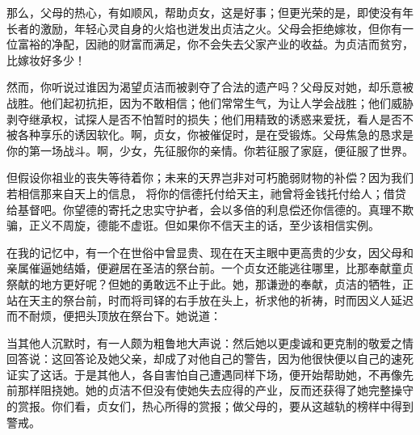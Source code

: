 那么，父母的热心，有如顺风，帮助贞女，这是好事；但更光荣的是，即使没有年长者的激励，年轻心灵自身的火焰也迸发出贞洁之火。父母会拒绝嫁妆，但你有一位富裕的净配，因祂的财富而满足，你不会失去父家产业的收益。为贞洁而贫穷，比嫁妆好多少！\par

然而，你听说过谁因为渴望贞洁而被剥夺了合法的遗产吗？父母反对她，却乐意被战胜。他们起初抗拒，因为不敢相信；他们常常生气，为让人学会战胜；他们威胁剥夺继承权，试探人是否不怕暂时的损失；他们用精致的诱惑来爱抚，看人是否不被各种享乐的诱因软化。啊，贞女，你被催促时，是在受锻炼。父母焦急的恳求是你的第一场战斗。啊，少女，先征服你的亲情。你若征服了家庭，便征服了世界。\par

但假设你祖业的丧失等待着你；未来的天界岂非对可朽脆弱财物的补偿？因为我们若相信那来自天上的信息， 将你的信德托付给天主，祂曾将金钱托付给人；借贷给基督吧。你望德的寄托之忠实守护者，会以多倍的利息偿还你信德的。真理不欺骗，正义不周旋，德能不虚诳。但如果你不信天主的话，至少该相信实例。\par

在我的记忆中，有一个在世俗中曾显贵、现在在天主眼中更高贵的少女，因父母和亲属催逼她结婚，便避居在圣洁的祭台前。一个贞女还能逃往哪里，比那奉献童贞祭献的地方更好呢？但她的勇敢远不止于此。她，那谦逊的奉献，贞洁的牺牲，正站在天主的祭台前，时而将司铎的右手放在头上，祈求他的祈祷，时而因义人延迟而不耐烦，便把头顶放在祭台下。她说道：\par

当其他人沉默时，有一人颇为粗鲁地大声说：然后她以更虔诚和更克制的敬爱之情回答说：这回答论及她父亲，却成了对他自己的警告，因为他很快便以自己的速死证实了这话。于是其他人，各自害怕自己遭遇同样下场，便开始帮助她，不再像先前那样阻挠她。她的贞洁不但没有使她失去应得的产业，反而还获得了她完整操守的赏报。你们看，贞女们，热心所得的赏报；做父母的，要从这越轨的榜样中得到警戒。\par

